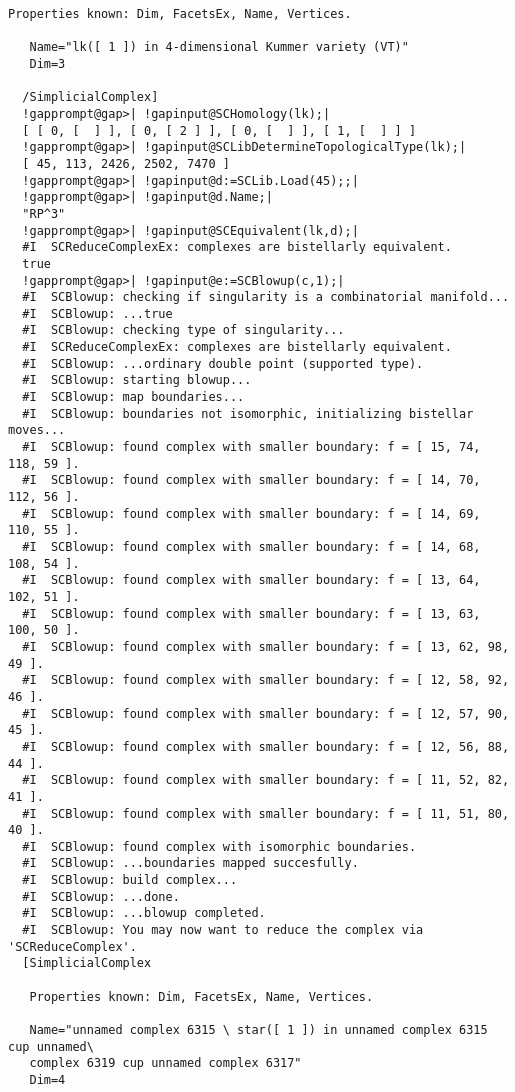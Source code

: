 \documentclass[a4paper,11pt]{report}
\begin{document}
{{\begin{Verbatim}[commandchars=!@|,fontsize=\small,frame=single,label=Example]
   Properties known: Dim, FacetsEx, Name, Vertices.
  
   Name="lk([ 1 ]) in 4-dimensional Kummer variety (VT)"
   Dim=3
  
  /SimplicialComplex]
  !gapprompt@gap>| !gapinput@SCHomology(lk);|
  [ [ 0, [  ] ], [ 0, [ 2 ] ], [ 0, [  ] ], [ 1, [  ] ] ]
  !gapprompt@gap>| !gapinput@SCLibDetermineTopologicalType(lk);|
  [ 45, 113, 2426, 2502, 7470 ]
  !gapprompt@gap>| !gapinput@d:=SCLib.Load(45);;|
  !gapprompt@gap>| !gapinput@d.Name;|
  "RP^3"
  !gapprompt@gap>| !gapinput@SCEquivalent(lk,d);|
  #I  SCReduceComplexEx: complexes are bistellarly equivalent.
  true
  !gapprompt@gap>| !gapinput@e:=SCBlowup(c,1);|
  #I  SCBlowup: checking if singularity is a combinatorial manifold...
  #I  SCBlowup: ...true
  #I  SCBlowup: checking type of singularity...
  #I  SCReduceComplexEx: complexes are bistellarly equivalent.
  #I  SCBlowup: ...ordinary double point (supported type).
  #I  SCBlowup: starting blowup...
  #I  SCBlowup: map boundaries...
  #I  SCBlowup: boundaries not isomorphic, initializing bistellar moves...
  #I  SCBlowup: found complex with smaller boundary: f = [ 15, 74, 118, 59 ].
  #I  SCBlowup: found complex with smaller boundary: f = [ 14, 70, 112, 56 ].
  #I  SCBlowup: found complex with smaller boundary: f = [ 14, 69, 110, 55 ].
  #I  SCBlowup: found complex with smaller boundary: f = [ 14, 68, 108, 54 ].
  #I  SCBlowup: found complex with smaller boundary: f = [ 13, 64, 102, 51 ].
  #I  SCBlowup: found complex with smaller boundary: f = [ 13, 63, 100, 50 ].
  #I  SCBlowup: found complex with smaller boundary: f = [ 13, 62, 98, 49 ].
  #I  SCBlowup: found complex with smaller boundary: f = [ 12, 58, 92, 46 ].
  #I  SCBlowup: found complex with smaller boundary: f = [ 12, 57, 90, 45 ].
  #I  SCBlowup: found complex with smaller boundary: f = [ 12, 56, 88, 44 ].
  #I  SCBlowup: found complex with smaller boundary: f = [ 11, 52, 82, 41 ].
  #I  SCBlowup: found complex with smaller boundary: f = [ 11, 51, 80, 40 ].
  #I  SCBlowup: found complex with isomorphic boundaries.
  #I  SCBlowup: ...boundaries mapped succesfully.
  #I  SCBlowup: build complex...
  #I  SCBlowup: ...done.
  #I  SCBlowup: ...blowup completed.
  #I  SCBlowup: You may now want to reduce the complex via 'SCReduceComplex'.
  [SimplicialComplex
  
   Properties known: Dim, FacetsEx, Name, Vertices.
  
   Name="unnamed complex 6315 \ star([ 1 ]) in unnamed complex 6315 cup unnamed\
   complex 6319 cup unnamed complex 6317"
   Dim=4
  

\end{Verbatim}}}
\end{document}
